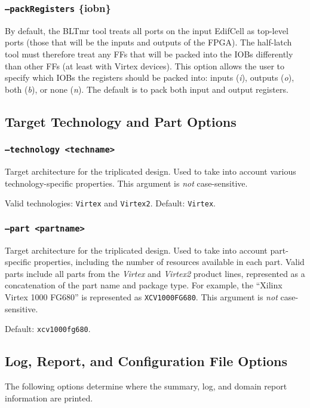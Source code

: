 \documentclass[english]{article}
\begin{document}
\subsubsection{\texttt{--packRegisters} \{i\textbar o\textbar b\textbar n\}}
By default, the BLTmr tool treats all ports on the input EdifCell as top-level
ports (those that will be the inputs and outputs of the FPGA). The half-latch 
tool must therefore treat any FFs that will be packed into the IOBs differently
than other FFs (at least with Virtex devices). This option allows the user to
specify which IOBs the registers should be packed into: inputs (\emph{i}),
outputs (\emph{o}), both (\emph{b}), or none (\emph{n}). The default is to pack
both input and output registers.

\subsection{Target Technology and Part Options}

\subsubsection{\texttt{--technology <techname>}}
Target architecture for the triplicated design. Used to take into account 
various technology-specific properties. This argument is \emph{not} 
case-sensitive.

Valid technologies: \texttt{Virtex} and \texttt{Virtex2}. Default: 
\texttt{Virtex}.

\subsubsection{\texttt{--part <partname>}}
Target architecture for the triplicated design. Used to take into account 
part-specific properties, including the number of resources available 
in each part. Valid parts include all parts from the \emph{Virtex} and 
\emph{Virtex2} product lines, represented as a concatenation of the part name 
and package type. For example, the ``Xilinx Virtex 1000 FG680'' is represented 
as \texttt{XCV1000FG680}. This argument is \emph{not} case-sensitive.

Default: \texttt{xcv1000fg680}.

\subsection{Log, Report, and Configuration File Options}
The following options determine where the summary, log, and domain report
information are printed.
\end{document}
